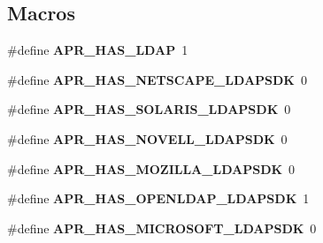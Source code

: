 \subsection*{Macros}
\begin{DoxyCompactItemize}
\item 
\hypertarget{group___a_p_r___util___l_d_a_p_gaf8d199208a26c4ee4c6db46764675f01}{\#define {\bfseries A\-P\-R\-\_\-\-H\-A\-S\-\_\-\-L\-D\-A\-P}~1}\label{group___a_p_r___util___l_d_a_p_gaf8d199208a26c4ee4c6db46764675f01}

\item 
\hypertarget{group___a_p_r___util___l_d_a_p_ga5ee3703cda47ea3fa8bb82b94341742c}{\#define {\bfseries A\-P\-R\-\_\-\-H\-A\-S\-\_\-\-N\-E\-T\-S\-C\-A\-P\-E\-\_\-\-L\-D\-A\-P\-S\-D\-K}~0}\label{group___a_p_r___util___l_d_a_p_ga5ee3703cda47ea3fa8bb82b94341742c}

\item 
\hypertarget{group___a_p_r___util___l_d_a_p_gadfd79510be01b585d07d3a0cf517377a}{\#define {\bfseries A\-P\-R\-\_\-\-H\-A\-S\-\_\-\-S\-O\-L\-A\-R\-I\-S\-\_\-\-L\-D\-A\-P\-S\-D\-K}~0}\label{group___a_p_r___util___l_d_a_p_gadfd79510be01b585d07d3a0cf517377a}

\item 
\hypertarget{group___a_p_r___util___l_d_a_p_ga61438dcd7b6c386fab3b3da59c884f2c}{\#define {\bfseries A\-P\-R\-\_\-\-H\-A\-S\-\_\-\-N\-O\-V\-E\-L\-L\-\_\-\-L\-D\-A\-P\-S\-D\-K}~0}\label{group___a_p_r___util___l_d_a_p_ga61438dcd7b6c386fab3b3da59c884f2c}

\item 
\hypertarget{group___a_p_r___util___l_d_a_p_ga6e9f26af3e9801f4f3dfb6ccb51ab4fe}{\#define {\bfseries A\-P\-R\-\_\-\-H\-A\-S\-\_\-\-M\-O\-Z\-I\-L\-L\-A\-\_\-\-L\-D\-A\-P\-S\-D\-K}~0}\label{group___a_p_r___util___l_d_a_p_ga6e9f26af3e9801f4f3dfb6ccb51ab4fe}

\item 
\hypertarget{group___a_p_r___util___l_d_a_p_ga53eb8a677574757eab3aeef411c79e82}{\#define {\bfseries A\-P\-R\-\_\-\-H\-A\-S\-\_\-\-O\-P\-E\-N\-L\-D\-A\-P\-\_\-\-L\-D\-A\-P\-S\-D\-K}~1}\label{group___a_p_r___util___l_d_a_p_ga53eb8a677574757eab3aeef411c79e82}

\item 
\hypertarget{group___a_p_r___util___l_d_a_p_ga4d353111e4fc3f79a7a9a4d9a37b4099}{\#define {\bfseries A\-P\-R\-\_\-\-H\-A\-S\-\_\-\-M\-I\-C\-R\-O\-S\-O\-F\-T\-\_\-\-L\-D\-A\-P\-S\-D\-K}~0}\label{group___a_p_r___util___l_d_a_p_ga4d353111e4fc3f79a7a9a4d9a37b4099}


\end{DoxyCompactItemize}
